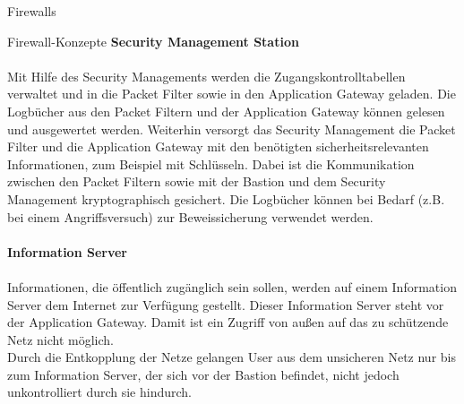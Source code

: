 \begin{section}{Firewalls}
\begin{subsection}{Firewall-Konzepte}
	\textbf{Security Management Station} \cite{Firewall1} \\ \\
	Mit Hilfe des Security Managements werden die Zugangskontrolltabellen verwaltet 
	und in die Packet Filter sowie in den Application Gateway geladen. 
	Die Logbücher aus den Packet Filtern und der Application Gateway können gelesen und ausgewertet werden. 
	Weiterhin versorgt das Security Management die Packet Filter und die Application Gateway 
	mit den benötigten sicherheitsrelevanten Informationen, zum Beispiel mit Schlüsseln.
	Dabei ist die Kommunikation zwischen den Packet Filtern sowie mit der Bastion 
	und dem Security Management kryptographisch gesichert. 
	Die Logbücher können bei Bedarf (z.B. bei einem Angriffsversuch) zur Beweissicherung verwendet werden. \\
	\\
	\textbf{Information Server} \cite{Firewall1} \\ \\
	Informationen, die öffentlich zugänglich sein sollen, werden auf einem 
	Information Server dem Internet zur Verfügung gestellt. 
	Dieser Information Server steht vor der Application Gateway. 
	Damit ist ein Zugriff von außen auf das zu schützende Netz nicht möglich.
	\\
	Durch die Entkopplung der Netze gelangen User aus dem unsicheren Netz 
	nur bis zum Information Server, der sich vor der Bastion befindet, nicht jedoch unkontrolliert durch sie hindurch.
	\\
  \end{subsection}
 \end{section}
\pagebreak
